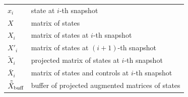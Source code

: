 \begin{table}[ht]
\begin{tabular}{p{2cm}l}
	\(x_i\)                        & state at \(i\)-th snapshot                              \\
	\(X\)                          & matrix of states                                        \\
	\(X_i\)                        & matrix of states at \(i\)-th snapshot                   \\
	\(X'_i\)                       & matrix of states at \((i+1)\)-th snapshot               \\
	\(\tilde{X}_i\)                & projected matrix of states at \(i\)-th snapshot         \\
	\(\bar{X}_i\)                  & matrix of states and controls at \(i\)-th snapshot      \\
	\(\tilde{\bar{X}} _{\text{buff}}\) & buffer of projected augmented matrices of states        \\
	\bottomrule
	\end{tabular}
\end{table}

